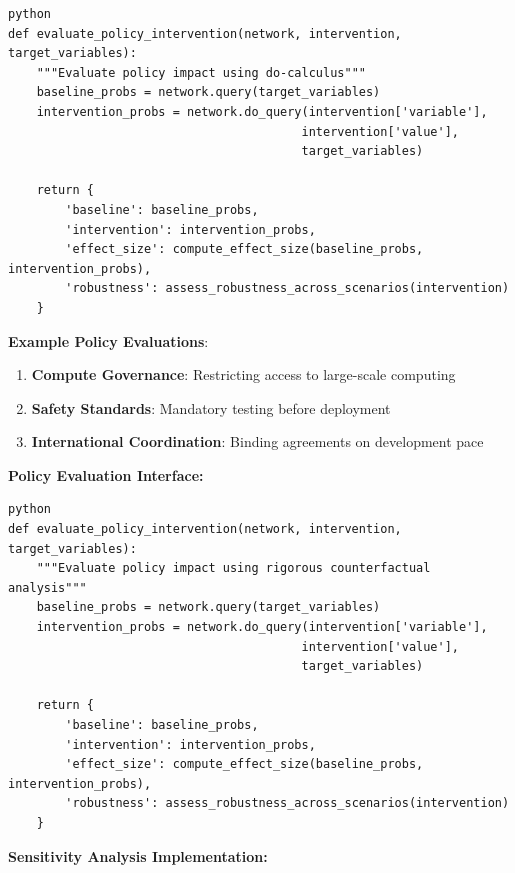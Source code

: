 \documentclass[
  11pt,
  letterpaper,
]{book}
\providecommand{\tightlist}{%
  \setlength{\itemsep}{0pt}\setlength{\parskip}{0pt}}
\begin{document}
\begin{verbatim}
python
def evaluate_policy_intervention(network, intervention, target_variables):
    """Evaluate policy impact using do-calculus"""
    baseline_probs = network.query(target_variables)
    intervention_probs = network.do_query(intervention['variable'], 
                                         intervention['value'],
                                         target_variables)
    
    return {
        'baseline': baseline_probs,
        'intervention': intervention_probs, 
        'effect_size': compute_effect_size(baseline_probs, intervention_probs),
        'robustness': assess_robustness_across_scenarios(intervention)
    }
\end{verbatim}

\textbf{Example Policy Evaluations}:

\begin{enumerate}
\def\labelenumi{\arabic{enumi}.}
\tightlist
\item
  \textbf{Compute Governance}: Restricting access to large-scale
  computing
\item
  \textbf{Safety Standards}: Mandatory testing before deployment
\item
  \textbf{International Coordination}: Binding agreements on development
  pace
\end{enumerate}

\textbf{Policy Evaluation Interface:}

\begin{verbatim}
python
def evaluate_policy_intervention(network, intervention, target_variables):
    """Evaluate policy impact using rigorous counterfactual analysis"""
    baseline_probs = network.query(target_variables)
    intervention_probs = network.do_query(intervention['variable'], 
                                         intervention['value'],
                                         target_variables)
    
    return {
        'baseline': baseline_probs,
        'intervention': intervention_probs, 
        'effect_size': compute_effect_size(baseline_probs, intervention_probs),
        'robustness': assess_robustness_across_scenarios(intervention)
    }
\end{verbatim}

\textbf{Sensitivity Analysis Implementation:}
\end{document}
